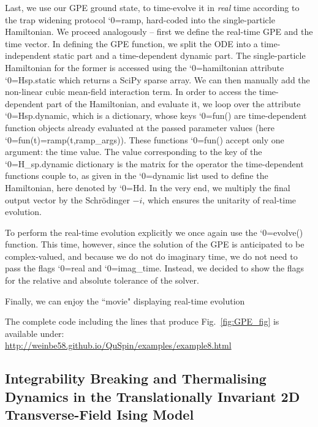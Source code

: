 \documentclass{SciPost}
\newcommand\0{\scalebox{-1}[1]{0}}
\let\svttfamily\ttfamily
\renewcommand\ttfamily{\svttfamily\catcode`0=\active }
\renewcommand\texttt{\bgroup\ttfamily\texttthelp}
\def\texttthelp#1{#1\egroup}
\newcommand{\GPcode}{example8.py}
\begin{document}
Last, we use our GPE ground state, to time-evolve it in \emph{real} time according to the trap widening protocol \texttt{ramp}, hard-coded into the single-particle Hamiltonian. We proceed analogously -- first we define the real-time GPE and the time vector. In defining the GPE function, we split the ODE into a time-independent static part and a time-dependent dynamic part. The single-particle Hamiltonian for the former is accessed using the \texttt{hamiltonian} attribute \texttt{Hsp.static} which returns a SciPy sparse array. We can then manually add the non-linear cubic mean-field interaction term. In order to access the time-dependent part of the Hamiltonian, and evaluate it, we loop over the attribute \texttt{Hsp.dynamic}, which is a dictionary, whose keys \texttt{fun()} are time-dependent function objects already evaluated at the passed parameter values  (here \texttt{fun(t)=ramp(t,ramp\_args)}). These functions \texttt{fun()} accept only one argument: the time value. The value corresponding to the key of the \texttt{H\_sp.dynamic} dictionary is the matrix for the operator the time-dependent functions couple to, as given in the \texttt{dynamic} list used to define the Hamiltonian, here denoted by \texttt{Hd}. In the very end, we multiply the final output vector by the Schr\"odinger $-i$, which ensures the unitarity of real-time evolution.

To perform the real-time evolution explicitly we once again use the \texttt{evolve()} function. This time, however, since the solution of the GPE is anticipated to be complex-valued, and because we do not do imaginary time, we do not need to pass the flags \texttt{real} and \texttt{imag\_time}. Instead, we decided to show the flags for the relative and absolute tolerance of the solver. 

Finally, we can enjoy the ``movie" displaying real-time evolution


The complete code including the lines that produce Fig.~\ref{fig:GPE_fig} is available under:\\

\href{http://weinbe58.github.io/QuSpin/examples/example8.html}{http://weinbe58.github.io/QuSpin/examples/example8.html}\\



\subsection{Integrability Breaking and Thermalising Dynamics in the Translationally Invariant 2D Transverse-Field Ising Model}
\label{subsec:higher_spin}
\end{document}
